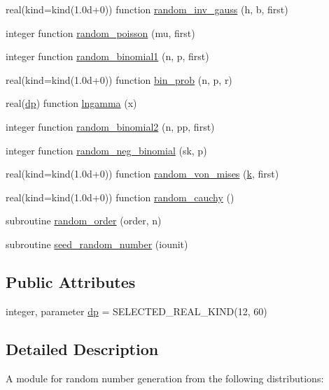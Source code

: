 \begin{DoxyCompactItemize}
\item 
real(kind=kind(1.\-0d+0)) function \hyperlink{classrandom_a238863a66d36cc568a878418c31e96b4}{random\-\_\-inv\-\_\-gauss} (h, b, first)
\item 
integer function \hyperlink{classrandom_a4ec519e7171cd11a636820c235a04e97}{random\-\_\-poisson} (mu, first)
\item 
integer function \hyperlink{classrandom_a9d4c34e7ad5aab9e084465c7842d1a8a}{random\-\_\-binomial1} (n, p, first)
\item 
real(kind=kind(1.\-0d+0)) function \hyperlink{classrandom_a09f3df72ead2420edd0672a21a7d210e}{bin\-\_\-prob} (n, p, r)
\item 
real(\hyperlink{classrandom_a0026984dfe1c95755ce81e2372a06f22}{dp}) function \hyperlink{classrandom_aeb29b320c803774e82f6245ad6f33aae}{lngamma} (x)
\item 
integer function \hyperlink{classrandom_aefecf83790063d8974d72c28293f2413}{random\-\_\-binomial2} (n, pp, first)
\item 
integer function \hyperlink{classrandom_a3107e0ecaf18a7095150c0f911aac145}{random\-\_\-neg\-\_\-binomial} (sk, p)
\item 
real(kind=kind(1.\-0d+0)) function \hyperlink{classrandom_ae89f09ae700db89c4e3593dda9e4d334}{random\-\_\-von\-\_\-mises} (\hyperlink{operator__wrappers_8f90_aec571ade653c1cf8fd6cde17285af055}{k}, first)
\item 
real(kind=kind(1.\-0d+0)) function \hyperlink{classrandom_a812d6055f4c3c34177a7681a2302b03b}{random\-\_\-cauchy} ()
\item 
subroutine \hyperlink{classrandom_a03e6b0b30475831f6d57082faed3bb34}{random\-\_\-order} (order, n)
\item 
subroutine \hyperlink{classrandom_a82f08f6c9b3c4740501abb1970397f8d}{seed\-\_\-random\-\_\-number} (iounit)
\end{DoxyCompactItemize}
\subsection*{Public Attributes}
\begin{DoxyCompactItemize}
\item 
integer, parameter \hyperlink{classrandom_a0026984dfe1c95755ce81e2372a06f22}{dp} = S\-E\-L\-E\-C\-T\-E\-D\-\_\-\-R\-E\-A\-L\-\_\-\-K\-I\-N\-D(12, 60)
\end{DoxyCompactItemize}


\subsection{Detailed Description}
A module for random number generation from the following distributions\-: 

